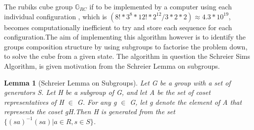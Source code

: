 \documentclass{article}
\newtheorem{lemma}[section]{Lemma}
\begin{document}
The rubiks cube group $\mathbb{G}_{RC}$ if to be implemented by a computer using each individual configuration , which is $(8!*3^8*12!*2^12/3*2*2) \approx 4.3*10^{19}$, becomes computationally inefficient to try and store each sequence for each configuration.The aim of implementing this algorithm however is to identify the groups composition structure by using subgroups to factorise the problem down, to solve the cube from a given state. The algorithm in question the Schreier Sims Algorithm, is given motivation from the Schreier Lemma on subgroups.

\begin{lemma}[Schreier Lemma on Subgroups]
Let G be a group with a set of generators S. Let H be a subgroup of G, and let A be the set of coset representatives of H $\in$ G. For any g $\in$ G, let g denote the element of A that represents the coset gH.\newline Then H is generated from the set $\{(sa)^{-1} (sa) | a \in R, s \in S \}$. 
\end{lemma}
\end{document}
